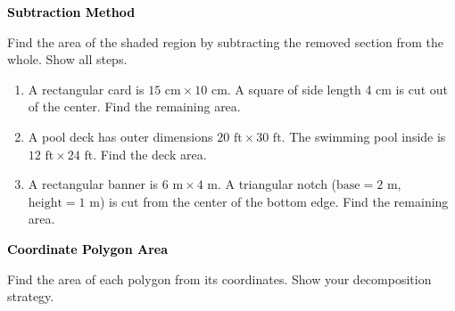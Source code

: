 \documentclass[12pt, letterpaper, fleqn]{article}
\begin{document}
\newpage

\begin{tcolorbox}[colback=black!10]
\large\textcolor{black}{\textbf{Subtraction Method}}
\end{tcolorbox}

\noindent
Find the area of the shaded region by subtracting the removed section from the whole. Show all steps.

\vspace{3mm}

\begin{enumerate}[itemsep=2.9cm, leftmargin=0.6cm]

\item A rectangular card is $15\text{ cm} \times 10\text{ cm}$. A square of side length 4 cm is cut out of the center. Find the remaining area.

\vspace{2cm}

\item A pool deck has outer dimensions $20\text{ ft} \times 30\text{ ft}$. The swimming pool inside is $12\text{ ft} \times 24\text{ ft}$. Find the deck area.

\vspace{2cm}

\item A rectangular banner is $6\text{ m} \times 4\text{ m}$. A triangular notch ($\text{base} = 2\text{ m}$, $\text{height} = 1\text{ m}$) is cut from the center of the bottom edge. Find the remaining area.

\vspace{2cm}

\end{enumerate}

\newpage

\begin{tcolorbox}[colback=black!10]
\large\textcolor{black}{\textbf{Coordinate Polygon Area}}
\end{tcolorbox}

\noindent
Find the area of each polygon from its coordinates. Show your decomposition strategy.

\vspace{3mm}
\end{document}
